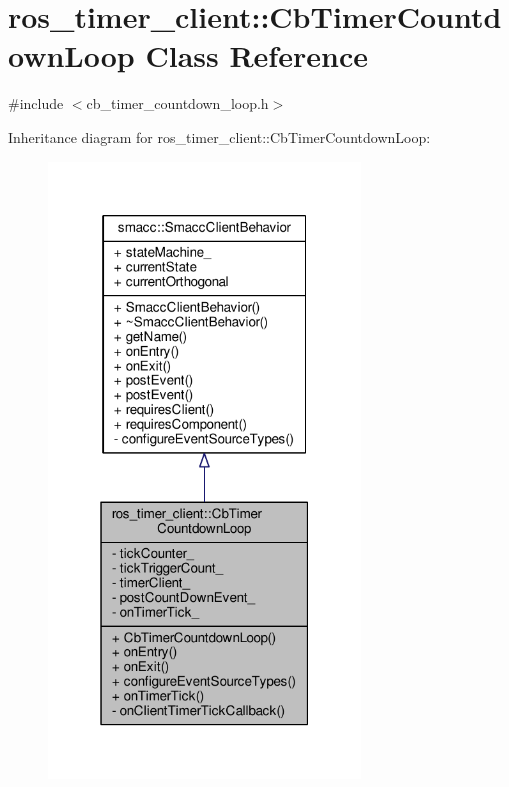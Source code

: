 \hypertarget{classros__timer__client_1_1CbTimerCountdownLoop}{}\section{ros\+\_\+timer\+\_\+client\+:\+:Cb\+Timer\+Countdown\+Loop Class Reference}
\label{classros__timer__client_1_1CbTimerCountdownLoop}


{\ttfamily \#include $<$cb\+\_\+timer\+\_\+countdown\+\_\+loop.\+h$>$}



Inheritance diagram for ros\+\_\+timer\+\_\+client\+:\+:Cb\+Timer\+Countdown\+Loop\+:\nopagebreak
\begin{figure}[H]
\begin{center}
\leavevmode
\includegraphics[width=235pt]{classros__timer__client_1_1CbTimerCountdownLoop__inherit__graph}
\end{center}
\end{figure}


